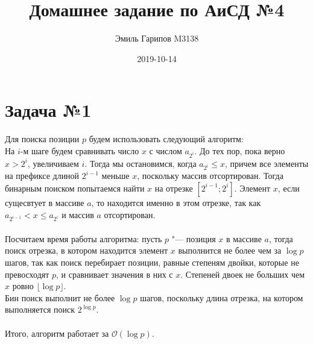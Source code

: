 \documentclass{article}
\title{Домашнее задание по АиСД №4}
\date{2019-10-14}
\author{Эмиль Гарипов M3138}
\begin{document}

\maketitle
\newpage
{}

\section*{Задача №1}
Для поиска позиции $p$ будем использовать следующий алгоритм: 
\\
На $i$-м шаге будем сравнивать число $x$ с числом $a_{2^i}$. До тех пор, пока верно $x > 2^i$, увеличиваем $i$. Тогда мы остановимся, когда $a_{2^i} \leq x$, причем все элементы на префиксе длиной $2^{i-1}$ меньше $x$, поскольку массив отсортирован. Тогда бинарным поиском попытаемся найти $x$ на отрезке $[2^{i - 1}; 2^i]$.  Элемент $x$, если сущесвтует в массиве $a$, то находится именно в этом отрезке, так как $a_{2^{i - 1}} < x \leq a_{2^{i}}$ и массив $a$ отсортирован.
\\\\
Посчитаем время работы алгоритма: пусть $p$ "--- позиция $x$ в массиве $a$, тогда поиск отрезка, в котором находится элемент $x$ выполнится не более чем за $\log{p}$ шагов, так как поиск перебирает позиции, равные степеням двойки, которые не превосходят $p$, и сравнивает значения в них с $x$. Степеней двоек не больших чем $x$ ровно $\lfloor \log{p} \rfloor$.
\\ Бин поиск выполнит не более $\log{p}$ шагов, поскольку длина отрезка, на котором выполняется поиск $2^{\log{p}}$. 
\\\\
Итого, алгоритм работает за $\mathcal{O}(\log{p})$.
\end{document}
